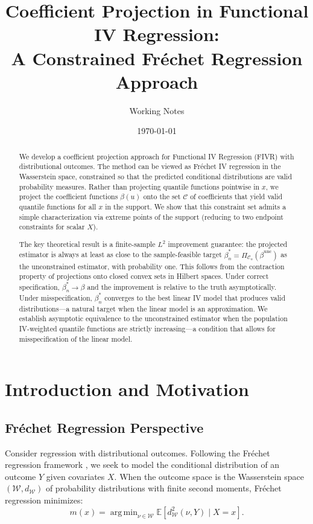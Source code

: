 \documentclass[12pt]{article}
\title{Coefficient Projection in Functional IV Regression: \\ A Constrained Fréchet Regression Approach}
\author{Working Notes}
\date{\today}
\newcommand{\E}{\mathbb{E}}
\DeclareMathOperator*{\argmin}{arg\,min}
\begin{document}
\maketitle

\begin{abstract}
We develop a coefficient projection approach for Functional IV Regression (FIVR) with distributional outcomes. The method can be viewed as Fréchet IV regression in the Wasserstein space, constrained so that the predicted conditional distributions are valid probability measures. Rather than projecting quantile functions pointwise in $x$, we project the coefficient functions $\beta(u)$ onto the set $\mathcal{C}$ of coefficients that yield valid quantile functions for all $x$ in the support. We show that this constraint set admits a simple characterization via extreme points of the support (reducing to two endpoint constraints for scalar $X$). 

The key theoretical result is a finite-sample $L^2$ improvement guarantee: the projected estimator is always at least as close to the sample-feasible target $\beta^*_n = \Pi_{\mathcal{C}_n}(\beta^{\text{unc}})$ as the unconstrained estimator, with probability one. This follows from the contraction property of projections onto closed convex sets in Hilbert spaces. Under correct specification, $\beta^*_n \to \beta$ and the improvement is relative to the truth asymptotically. Under misspecification, $\beta^*_n$ converges to the best linear IV model that produces valid distributions---a natural target when the linear model is an approximation. We establish asymptotic equivalence to the unconstrained estimator when the population IV-weighted quantile functions are strictly increasing---a condition that allows for misspecification of the linear model.
\end{abstract}

\section{Introduction and Motivation}

\subsection{Fréchet Regression Perspective}

Consider regression with distributional outcomes. Following the Fréchet regression framework \cite{petersen2019frechet}, we seek to model the conditional distribution of an outcome $Y$ given covariates $X$. When the outcome space is the Wasserstein space $(\mathcal{W}, d_{\mathcal{W}})$ of probability distributions with finite second moments, Fréchet regression minimizes:
\begin{equation}\label{eq:frechet-obj}
m(x) = \argmin_{\nu \in \mathcal{W}} \E[d_{\mathcal{W}}^2(\nu, Y) \mid X = x].
\end{equation}
\end{document}
